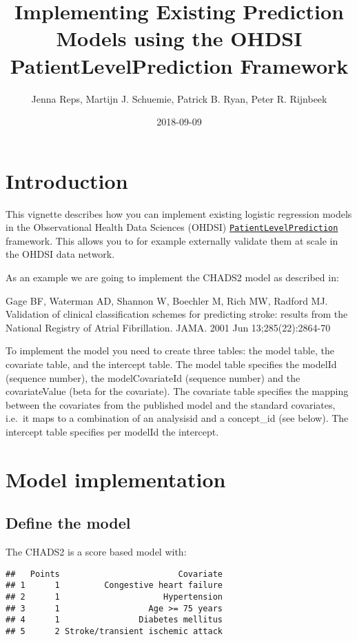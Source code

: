 \documentclass[]{article}
\title{Implementing Existing Prediction Models using the OHDSI
PatientLevelPrediction Framework}
\author{Jenna Reps, Martijn J. Schuemie, Patrick B. Ryan, Peter R. Rijnbeek}
\date{2018-09-09}
\begin{document}
\maketitle

{
\setcounter{tocdepth}{2}
\tableofcontents
}
\section{Introduction}\label{introduction}

This vignette describes how you can implement existing logistic
regression models in the Observational Health Data Sciences (OHDSI)
\href{http://www.github.com/OHDSI/PatientLevelPrediction}{\texttt{PatientLevelPrediction}}
framework. This allows you to for example externally validate them at
scale in the OHDSI data network.

As an example we are going to implement the CHADS2 model as described
in:

Gage BF, Waterman AD, Shannon W, Boechler M, Rich MW, Radford MJ.
Validation of clinical classification schemes for predicting stroke:
results from the National Registry of Atrial Fibrillation. JAMA. 2001
Jun 13;285(22):2864-70

To implement the model you need to create three tables: the model table,
the covariate table, and the intercept table. The model table specifies
the modelId (sequence number), the modelCovariateId (sequence number)
and the covariateValue (beta for the covariate). The covariate table
specifies the mapping between the covariates from the published model
and the standard covariates, i.e.~it maps to a combination of an
analysisid and a concept\_id (see below). The intercept table specifies
per modelId the intercept.

\section{Model implementation}\label{model-implementation}

\subsection{Define the model}\label{define-the-model}

The CHADS2 is a score based model with:

\begin{verbatim}
##   Points                        Covariate
## 1      1         Congestive heart failure
## 2      1                     Hypertension
## 3      1                  Age >= 75 years
## 4      1                Diabetes mellitus
## 5      2 Stroke/transient ischemic attack
\end{verbatim}
\end{document}
